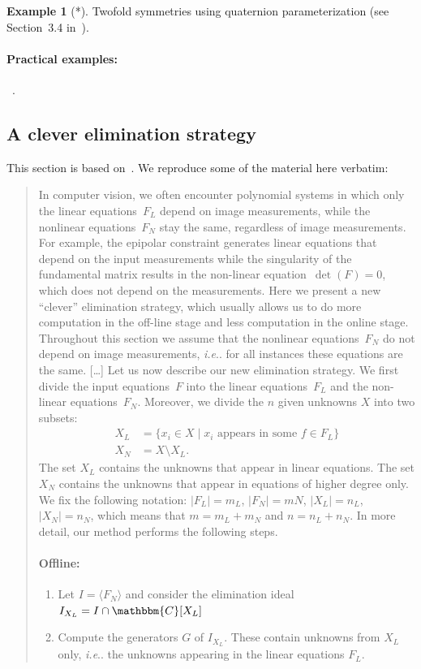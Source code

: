 \documentclass[11pt,a4paper]{article}
\makeatletter
\theoremstyle{definition}
\newtheorem{example}{Example}
\newcommand{\C}{\ensuremath{\mathbbm{C}}}
\DeclareRobustCommand\ie{\emph{i.e}\@ifnextchar.{}{.\@}}
\newcommand{\pexamples}{\paragraph{Practical examples:}}
\makeatother
\begin{document}
\begin{example}[*]
Twofold symmetries using quaternion parameterization (see Section~3.4 in~\cite{larsson-phd}).
\end{example}

\pexamples~\cite{larsson-etal-cvpr-2018,wu-cvpr-2015}.

\subsection{A clever elimination strategy}
This section is based on~\cite{kukelova-etal-2017-cvpr}. We reproduce some of the material
here verbatim:

\begin{quote}
In computer vision, we often encounter polynomial systems in which only the linear equations~$F_L$
depend on image measurements, while the nonlinear equations~$F_N$ stay the same, regardless of
image measurements. For example, the epipolar constraint generates linear equations that depend
on the input measurements while the singularity of the fundamental matrix results in the non-linear
equation~$\det(F) = 0$, which does not depend on the measurements. Here we present a new ``clever''
elimination strategy, which usually allows us to do more computation in the off-line stage and less
computation in the online stage.
Throughout this section we assume that the nonlinear equations~$F_N$ do not depend on image
measurements, \ie{} for all instances these equations are the same.
[\ldots]
Let us now describe our new elimination strategy. We first divide the input equations~$F$ into the
linear equations~$F_L$ and the non-linear equations~$F_N$. Moreover, we divide the $n$ given unknowns
$X$ into two subsets:
\begin{equation}
    \begin{aligned}
        X_L &= \{x_i\in X\;|\;x_i\text{ appears in some }f\in F_L\}\\
        X_N &= X\setminus X_L.
    \end{aligned}
\end{equation}
The set $X_L$ contains the unknowns that appear in linear equations. The set $X_N$ contains the
unknowns that appear in equations of higher degree only. We fix the following notation:
$|F_L|=m_L$, $|F_N|=mN$, $|X_L|=n_L$, $|X_N|=n_N$, which means that $m=m_L+m_N$ and $n=n_L+n_N$.
In more detail, our method performs the following steps.
\pagebreak
\paragraph{Offline:}
\begin{enumerate}
    \item Let $I = \langle F_N \rangle$ and consider the elimination
    ideal~$I_{X_L}=I\cap \C[X_L]$
    \item Compute the generators $G$ of $I_{X_L}$. These contain unknowns from $X_L$ only, \ie{}
    the unknowns appearing in the linear equations $F_L$.
\end{enumerate}

\end{quote}
\end{document}

